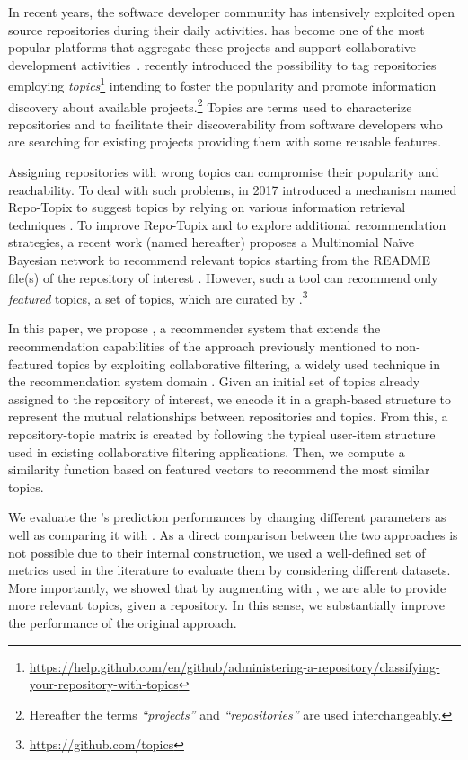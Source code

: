 In recent years, the software developer community has intensively exploited open source 
repositories during their daily activities. \GH has become one of the most
popular platforms that aggregate these projects and support collaborative 
development activities~\cite{7832894}. \GH recently introduced the possibility 
to tag repositories employing 
\emph{topics}\footnote{\url{https://help.github.com/en/github/administering-a-repository/classifying-your-repository-with-topics}}
 intending to foster the popularity and promote information discovery about 
available projects.\footnote{Hereafter the terms \GH  \emph{``projects''} and \emph{``repositories''} 
are used 
interchangeably.} Topics are terms used to characterize repositories and to 
facilitate their discoverability from software developers who are searching 
for existing projects providing them with some reusable features. 

Assigning repositories with wrong topics can compromise their popularity and 
reachability. To deal with such problems, in 2017 \GH introduced a 
mechanism named Repo-Topix to suggest topics by relying on various information 
retrieval techniques \cite{repo-topix}. To improve Repo-Topix 
and to explore additional recommendation strategies, a recent work (named \MNB 
hereafter) proposes a Multinomial Na\"ive Bayesian network to 
recommend relevant topics starting from the README file(s) of the repository of 
interest \cite{10.1145/3383219.3383227}. However, such a tool can recommend 
only \emph{featured} topics, \ie a set of topics, which are curated by 
\GH.\footnote{\url{https://github.com/topics}}


In this paper, we propose \TF, a recommender system that extends the 
recommendation capabilities of the \MNB approach previously mentioned to 
non-featured topics by exploiting collaborative filtering, a widely used 
technique in the recommendation system domain 
\cite{Schafer:2007:CFR:1768197.1768208}. Given an initial set of topics already 
assigned to the \GH repository of interest, we encode it in a graph-based 
structure to represent the mutual relationships between repositories and 
topics. From this, a repository-topic matrix is created by following the 
typical user-item structure used in existing collaborative filtering 
applications. Then, we compute a similarity function based on featured vectors 
to recommend the most similar topics.

We evaluate the \TF's prediction performances by changing different parameters 
as well as comparing it with \MNB. As a direct comparison between the two approaches %
is not
possible due to their internal construction, 
we used a well-defined set of metrics used in the literature to evaluate them by 
considering different datasets. More importantly, we showed that by augmenting \MNB with \TF, we are able to provide more relevant topics, given a repository. In this sense, we substantially improve the performance of the original \MNB approach.

